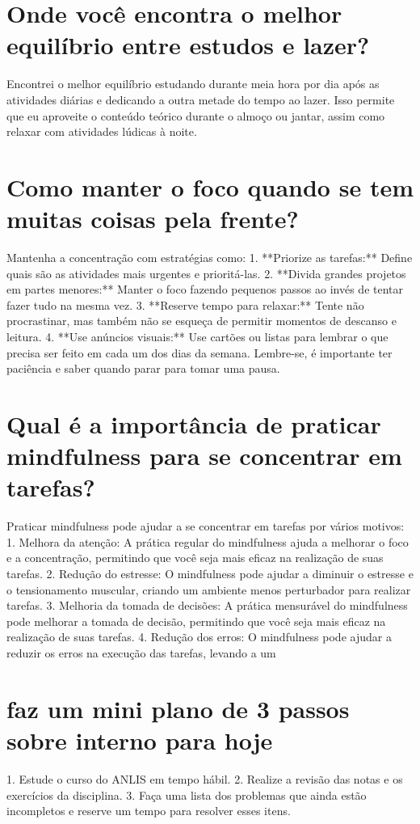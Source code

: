 \documentclass[11pt,a4paper]{article}
\begin{document}
\section{Onde você encontra o melhor equilíbrio entre estudos e lazer?}
Encontrei o melhor equilíbrio estudando durante meia hora por dia após as atividades diárias e dedicando a outra metade do tempo ao lazer. Isso permite que eu aproveite o conteúdo teórico durante o almoço ou jantar, assim como relaxar com atividades lúdicas à noite.

\section{Como manter o foco quando se tem muitas coisas pela frente?}
Mantenha a concentração com estratégias como: 1. **Priorize as tarefas:** Define quais são as atividades mais urgentes e prioritá-las. 2. **Divida grandes projetos em partes menores:** Manter o foco fazendo pequenos passos ao invés de tentar fazer tudo na mesma vez. 3. **Reserve tempo para relaxar:** Tente não procrastinar, mas também não se esqueça de permitir momentos de descanso e leitura. 4. **Use anúncios visuais:** Use cartões ou listas para lembrar o que precisa ser feito em cada um dos dias da semana. Lembre-se, é importante ter paciência e saber quando parar para tomar uma pausa.

\section{Qual é a importância de praticar mindfulness para se concentrar em tarefas?}
Praticar mindfulness pode ajudar a se concentrar em tarefas por vários motivos: 1. Melhora da atenção: A prática regular do mindfulness ajuda a melhorar o foco e a concentração, permitindo que você seja mais eficaz na realização de suas tarefas. 2. Redução do estresse: O mindfulness pode ajudar a diminuir o estresse e o tensionamento muscular, criando um ambiente menos perturbador para realizar tarefas. 3. Melhoria da tomada de decisões: A prática mensurável do mindfulness pode melhorar a tomada de decisão, permitindo que você seja mais eficaz na realização de suas tarefas. 4. Redução dos erros: O mindfulness pode ajudar a reduzir os erros na execução das tarefas, levando a um

\section{faz um mini plano de 3 passos sobre interno para hoje}
1. Estude o curso do ANLIS em tempo hábil. 2. Realize a revisão das notas e os exercícios da disciplina. 3. Faça uma lista dos problemas que ainda estão incompletos e reserve um tempo para resolver esses itens.
\end{document}
